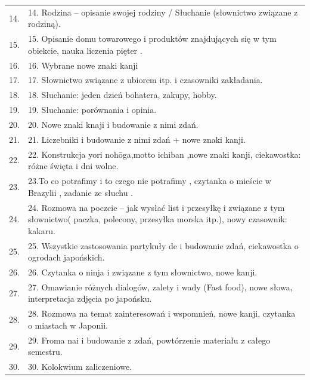 \documentclass[12pt, a4paper]{article}
\begin{document}
{\begin{longtable}{m{1.5cm}m{14.5cm}}
  \rowcolor{tableRowAlt} 14. & 14.  Rodzina – opisanie swojej rodziny / Słuchanie (słownictwo związane z rodziną). \\
  \rowcolor{tableRowLight} 15. & 15.  Opisanie domu towarowego i produktów znajdujących się w tym obiekcie, nauka liczenia pięter . \\
  \rowcolor{tableRowAlt} 16. & 16. Wybrane nowe znaki kanji \\
  \rowcolor{tableRowLight} 17. & 17. Słownictwo związane z ubiorem itp. i czasowniki zakładania. \\
  \rowcolor{tableRowAlt} 18. & 18. Słuchanie: jeden dzień bohatera, zakupy, hobby. \\
  \rowcolor{tableRowLight} 19. & 19.  Słuchanie: porównania i opinia. \\
  \rowcolor{tableRowAlt} 20. & 20.  Nowe znaki knaji i budowanie z nimi zdań. \\
  \rowcolor{tableRowLight} 21. & 21. Liczebniki i budowanie z nimi zdań + nowe znaki kanji. \\
  \rowcolor{tableRowAlt} 22. & 22. Konstrukcja yori nohōga,motto ichiban ,nowe znaki kanji, ciekawostka: różne święta i dni wolne. \\
  \rowcolor{tableRowLight} 23. & 23.To co potrafimy i to czego nie potrafimy , czytanka o mieście w Brazylii , zadanie ze słuchu . \\
  \rowcolor{tableRowAlt} 24. & 24.  Rozmowa na poczcie – jak wysłać list i przesyłkę i związane z tym słownictwo( paczka, polecony, przesyłka morska itp.), nowy czasownik: kakaru. \\
  \rowcolor{tableRowLight} 25. & 25.  Wszystkie zastosowania partykuły de i budowanie zdań, ciekawostka o ogrodach japońskich. \\
  \rowcolor{tableRowAlt} 26. & 26.  Czytanka o ninja i związane z tym słownictwo, nowe kanji. \\
  \rowcolor{tableRowLight} 27. & 27.  Omawianie różnych dialogów, zalety i wady  (Fast food), nowe słowa, interpretacja zdjęcia po japońsku. \\
  \rowcolor{tableRowAlt} 28. & 28.  Rozmowa na temat zainteresowań i wspomnień, nowe kanji, czytanka o miastach w Japonii. \\
  \rowcolor{tableRowLight} 29. & 29.  Froma nai i budowanie z zdań, powtórzenie materiału z całego semestru. \\
  \rowcolor{tableRowAlt} 30. & 30.  Kolokwium zaliczeniowe. \\
\bottomrule
\end{longtable}}
\end{document}
